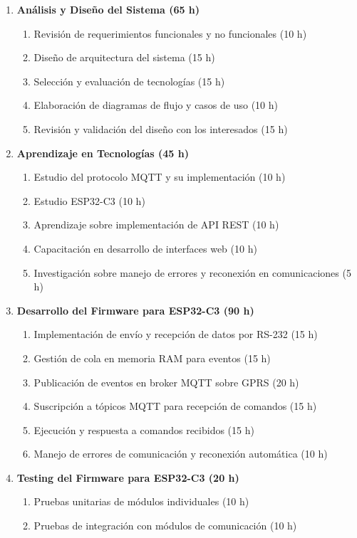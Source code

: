 \documentclass[
11pt, %
]{charter}
\begin{document}
\begin{enumerate}
\item \textbf{Análisis y Diseño del Sistema (65 h)}
\begin{enumerate}
\item Revisión de requerimientos funcionales y no funcionales (10 h)
\item Diseño de arquitectura del sistema (15 h)
\item Selección y evaluación de tecnologías (15 h)
\item Elaboración de diagramas de flujo y casos de uso (10 h)
\item Revisión y validación del diseño con los interesados (15 h)
\end{enumerate}
\item \textbf{Aprendizaje en Tecnologías (45 h)}
\begin{enumerate}
\item Estudio del protocolo MQTT y su implementación (10 h)
\item Estudio ESP32-C3 (10 h)
\item Aprendizaje sobre implementación de API REST (10 h)
\item Capacitación en desarrollo de interfaces web (10 h)
\item Investigación sobre manejo de errores y reconexión en comunicaciones (5 h)
\end{enumerate}
\item \textbf{Desarrollo del Firmware para ESP32-C3 (90 h)}
\begin{enumerate}
\item Implementación de envío y recepción de datos por RS-232 (15 h)
\item Gestión de cola en memoria RAM para eventos (15 h)
\item Publicación de eventos en broker MQTT sobre GPRS (20 h)
\item Suscripción a tópicos MQTT para recepción de comandos (15 h)
\item Ejecución y respuesta a comandos recibidos (15 h)
\item Manejo de errores de comunicación y reconexión automática (10 h)
\end{enumerate}
\item \textbf{Testing del Firmware para ESP32-C3 (20 h)}
\begin{enumerate}
\item Pruebas unitarias de módulos individuales (10 h)
\item Pruebas de integración con módulos de comunicación (10 h)

\end{enumerate}
\end{enumerate}
\end{document}
